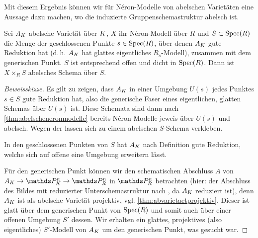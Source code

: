 \documentclass[german, bibliography=totoc]{scrreprt}
\begin{document}
Mit diesem Ergebnis können wir für Néron-Modelle von
abelschen Varietäten eine Aussage dazu machen, wo die induzierte
Gruppenschemastruktur abelsch ist.
\begin{Satz}\label{thm:teilwabelscheneronmodelle}
  Sei $A_{K}$ abelsche Varietät über $K$,
  $X$ ihr Néron-Modell über $R$ und
  $S\subset\operatorname{Spec}(R)$ die Menge der geschlossenen Punkte
  $s\in\operatorname{Spec}(R)$, über denen $A_{K}$ gute Reduktion hat (d.\,h. $A_{K}$
  hat glattes eigentliches $R_s$-Modell), zusammen mit dem generischen
  Punkt.
  $S$ ist entsprechend offen und dicht in $\operatorname{Spec}(R)$.
  Dann ist $X\times_R S$ abelsches Schema über $S$.
  \begin{proof}[Beweisskizze]
    Es gilt zu zeigen, dass $A_{K}$ in einer Umgebung $U(s)$ jedes
    Punktes $s\in S$ gute Reduktion hat, also die generische Faser eines
    eigentlichen, glatten Schemas über $U(s)$ ist.
    Diese Schemata sind dann nach \ref{thm:abelscheneronmodelle}
    bereits Néron-Modelle jeweis über $U(s)$ und abelsch.
    Wegen der \NAbbEig lassen sich zu einem abelschen $S$-Schema
    verkleben.

    In den geschlossenen Punkten von $S$ hat $A_{K}$ nach Definition
    gute Reduktion, welche sich auf offene eine Umgebung erweitern
    lässt.
    
    Für den generischen Punkt können wir den schematischen
    Abschluss $A$ von $A_\K\to\P_\K^n\to\P_R^n$ in $\P_R^n$
    betrachten
    (hier: der Abschluss des Bildes mit reduzierter
    Unterschemastruktur nach \cite[Remark 10.32]{wedhorn}, da $A_{K}$
    reduziert ist),
    denn $A_{K}$ ist als abelsche Varietät projektiv,
    vgl. \ref{thm:abvarietaetprojektiv}.
    Dieser ist glatt über dem generischen Punkt von $\operatorname{Spec}(R)$
    und somit auch über einer offenen Umgebung $S'$ dessen.
    Wir erhalten ein glattes, projektives (also eigentliches)
    $S'$-Modell von $A_{K}$ um den generischen Punkt, was gesucht war.
  \end{proof}
\end{Satz}

\end{document}

